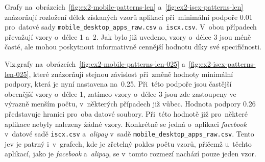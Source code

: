 Grafy na~obrázcích~\ref{fig:ex2-mobile-patterns-len} a~\ref{fig:ex2-iscx-patterns-len} znázorňují rozložení délek získaných vzorů aplikací při~minimální podpoře 0.01 pro~datové sady \texttt{mobile\_desktop\_apps\_raw.csv} a~\texttt{iscx.csv}. V~obou případech převažují vzory o~délce 1 a~2. Jak bylo již uvedeno, vzory o~délce 3 jsou méně časté, ale mohou poskytnout informativně cennější hodnotu díky své specifičnosti. 

Viz.grafy na~obrázcích~\ref{fig:ex2-mobile-patterns-len-025} a~\ref{fig:ex2-iscx-patterns-len-025}, které znázorňují stejnou závislost při~změně hodnoty minimální podpory, která je nyní nastavena na~0.25. Při~této podpoře jsou častější obecnější vzory o~délce 1, zatímco vzory o~délce 3 jsou zde zastoupeny ve výrazně menším počtu, v~některých případech již vůbec. Hodnota podpory 0.26 představuje hranici pro~oba datové soubory. Při~této hodnotě již pro~některé aplikace nebyly nalezeny žádné vzory. Konkrétně se jedná o~aplikaci \textit{facebook} v~datové sadě \texttt{iscx.csv} a~\textit{alipay} v~sadě \texttt{mobile\_desktop\_apps\_raw.csv}. Tento jev je patrný i~v~grafech, kde je zřetelný pokles počtu vzorů, přičemž u~těchto aplikací, jako je \textit{facebook} a~\textit{alipay}, se v~tomto rozmezí nachází pouze jeden vzor.

